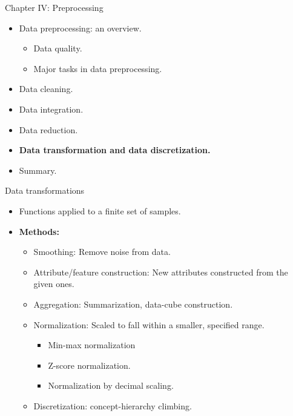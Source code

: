 \documentclass[aspectratio=169,t]{beamer}
\begin{document}
  { 
    \begin{frame}{Chapter IV: Preprocessing}
        \begin{itemize}
            \item Data preprocessing: an overview.
            \begin{itemize}
              \item Data quality.
              \item Major tasks in data preprocessing.
            \end{itemize}
            \item Data cleaning.
            \item Data integration.
            \item Data reduction.
            \item \textbf{Data transformation and data discretization.}
            \item Summary.
        \end{itemize}
    \end{frame}
  }

 {
    \begin{frame}{Data transformations}
    \begin{itemize}
      \item Functions applied to a finite set of samples.
      \item \textbf{Methods:}
      \begin{itemize}
        \item Smoothing: Remove noise from data.
        \item Attribute/feature construction: New attributes constructed from the given ones.
        \item Aggregation: Summarization, data-cube construction.
        \item Normalization: Scaled to fall within a smaller, specified range.
        \begin{itemize}
          \item Min-max normalization
          \item Z-score normalization.
          \item Normalization by decimal scaling.
        \end{itemize}
        \item Discretization: concept-hierarchy climbing.
      \end{itemize}
    \end{itemize}
    \end{frame}
  }
\end{document}
